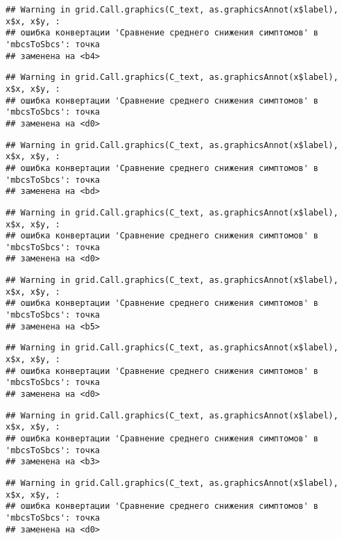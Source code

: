 \documentclass[
]{article}
\begin{document}
\begin{verbatim}
## Warning in grid.Call.graphics(C_text, as.graphicsAnnot(x$label), x$x, x$y, :
## ошибка конвертации 'Сравнение среднего снижения симптомов' в 'mbcsToSbcs': точка
## заменена на <b4>
\end{verbatim}

\begin{verbatim}
## Warning in grid.Call.graphics(C_text, as.graphicsAnnot(x$label), x$x, x$y, :
## ошибка конвертации 'Сравнение среднего снижения симптомов' в 'mbcsToSbcs': точка
## заменена на <d0>
\end{verbatim}

\begin{verbatim}
## Warning in grid.Call.graphics(C_text, as.graphicsAnnot(x$label), x$x, x$y, :
## ошибка конвертации 'Сравнение среднего снижения симптомов' в 'mbcsToSbcs': точка
## заменена на <bd>
\end{verbatim}

\begin{verbatim}
## Warning in grid.Call.graphics(C_text, as.graphicsAnnot(x$label), x$x, x$y, :
## ошибка конвертации 'Сравнение среднего снижения симптомов' в 'mbcsToSbcs': точка
## заменена на <d0>
\end{verbatim}

\begin{verbatim}
## Warning in grid.Call.graphics(C_text, as.graphicsAnnot(x$label), x$x, x$y, :
## ошибка конвертации 'Сравнение среднего снижения симптомов' в 'mbcsToSbcs': точка
## заменена на <b5>
\end{verbatim}

\begin{verbatim}
## Warning in grid.Call.graphics(C_text, as.graphicsAnnot(x$label), x$x, x$y, :
## ошибка конвертации 'Сравнение среднего снижения симптомов' в 'mbcsToSbcs': точка
## заменена на <d0>
\end{verbatim}

\begin{verbatim}
## Warning in grid.Call.graphics(C_text, as.graphicsAnnot(x$label), x$x, x$y, :
## ошибка конвертации 'Сравнение среднего снижения симптомов' в 'mbcsToSbcs': точка
## заменена на <b3>
\end{verbatim}

\begin{verbatim}
## Warning in grid.Call.graphics(C_text, as.graphicsAnnot(x$label), x$x, x$y, :
## ошибка конвертации 'Сравнение среднего снижения симптомов' в 'mbcsToSbcs': точка
## заменена на <d0>
\end{verbatim}
\end{document}
